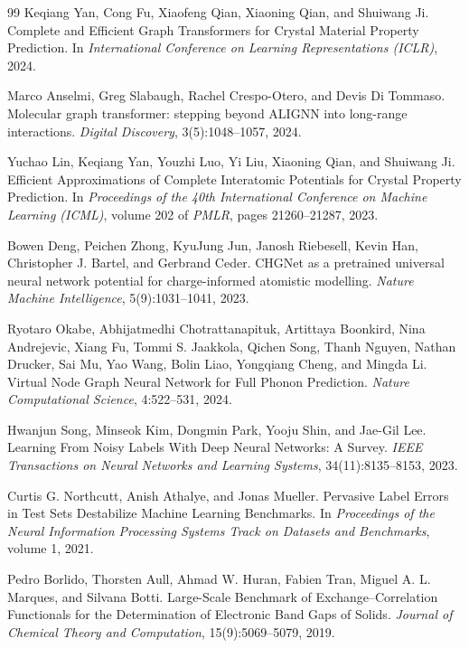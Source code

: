 \documentclass[a4paper,11pt]{article}
\begin{document}
\begin{thebibliography}{99}
Keqiang Yan, Cong Fu, Xiaofeng Qian, Xiaoning Qian, and Shuiwang Ji.
\newblock Complete and Efficient Graph Transformers for Crystal Material Property Prediction.
\newblock In \emph{International Conference on Learning Representations (ICLR)}, 2024.

Marco Anselmi, Greg Slabaugh, Rachel Crespo-Otero, and Devis Di Tommaso.
\newblock Molecular graph transformer: stepping beyond ALIGNN into long-range interactions.
\newblock \emph{Digital Discovery}, 3(5):1048--1057, 2024.

Yuchao Lin, Keqiang Yan, Youzhi Luo, Yi Liu, Xiaoning Qian, and Shuiwang Ji.
\newblock Efficient Approximations of Complete Interatomic Potentials for Crystal Property Prediction.
\newblock In \emph{Proceedings of the 40th International Conference on Machine Learning (ICML)}, volume 202 of \emph{PMLR}, pages 21260--21287, 2023.

Bowen Deng, Peichen Zhong, KyuJung Jun, Janosh Riebesell, Kevin Han, Christopher J. Bartel, and Gerbrand Ceder.
\newblock CHGNet as a pretrained universal neural network potential for charge-informed atomistic modelling.
\newblock \emph{Nature Machine Intelligence}, 5(9):1031--1041, 2023.

Ryotaro Okabe, Abhijatmedhi Chotrattanapituk, Artittaya Boonkird, Nina Andrejevic, Xiang Fu, Tommi S. Jaakkola, Qichen Song, Thanh Nguyen, Nathan Drucker, Sai Mu, Yao Wang, Bolin Liao, Yongqiang Cheng, and Mingda Li.
\newblock Virtual Node Graph Neural Network for Full Phonon Prediction.
\newblock \emph{Nature Computational Science}, 4:522--531, 2024.

Hwanjun Song, Minseok Kim, Dongmin Park, Yooju Shin, and Jae-Gil Lee.
\newblock Learning From Noisy Labels With Deep Neural Networks: A Survey.
\newblock \emph{IEEE Transactions on Neural Networks and Learning Systems}, 34(11):8135--8153, 2023.

Curtis G. Northcutt, Anish Athalye, and Jonas Mueller.
\newblock Pervasive Label Errors in Test Sets Destabilize Machine Learning Benchmarks.
\newblock In \emph{Proceedings of the Neural Information Processing Systems Track on Datasets and Benchmarks}, volume 1, 2021.

Pedro Borlido, Thorsten Aull, Ahmad W. Huran, Fabien Tran, Miguel A. L. Marques, and Silvana Botti.
\newblock Large-Scale Benchmark of Exchange--Correlation Functionals for the Determination of Electronic Band Gaps of Solids.
\newblock \emph{Journal of Chemical Theory and Computation}, 15(9):5069--5079, 2019.


\end{thebibliography}
\end{document}
